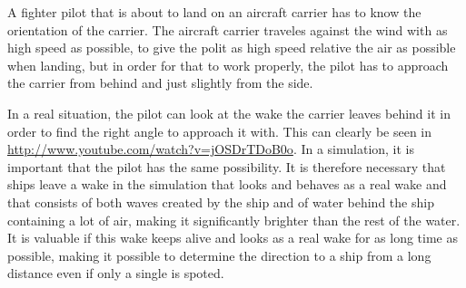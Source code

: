 A fighter pilot that is about to land on an aircraft carrier has to know the orientation of the carrier. The aircraft carrier traveles against the wind with as high speed as possible, to give the polit as high speed relative the air as possible when landing, but in order for that to work properly, the pilot has to approach the carrier from behind and just slightly from the side.

In a real situation, the pilot can look at the wake the carrier leaves behind it in order to find the right angle to approach it with. This can clearly be seen in \url{http://www.youtube.com/watch?v=jOSDrTDoB0o}. In a simulation, it is important that the pilot has the same possibility. It is therefore necessary that ships leave a wake in the simulation that looks and behaves as a real wake and that consists of both waves created by the ship and of water behind the ship containing a lot of air, making it significantly brighter than the rest of the water. It is valuable if this wake keeps alive and looks as a real wake for as long time as possible, making it possible to determine the direction to a ship from a long distance even if only a single  is spoted.